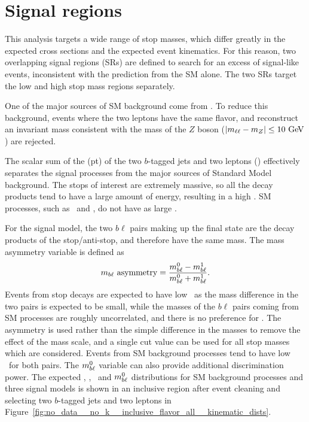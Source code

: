 \FloatBarrier
\section{Signal regions}
\label{sec:signal_regions}

This analysis targets a wide range of stop masses, which differ greatly in the
expected cross sections and the expected event kinematics.
For this reason, two overlapping signal regions (SRs) are defined to search for
an excess of signal-like events, inconsistent with the prediction from
the SM alone.
The two SRs target the low and high stop mass regions separately.

One of the major sources of SM background come from \ZGAMMAJETS.
To reduce this background, events where the two leptons have the same
flavor, and reconstruct an invariant mass consistent with the mass of the $Z$
boson ($|m_{\ell\ell} - m_{Z}| \leq 10 \GeV$) are rejected.

The scalar sum of the \et(pt) of the two $b$-tagged jets and two leptons (\HT) 
effectively separates the signal processes from the major sources of
Standard Model background.
The stops of interest are extremely massive, so all the decay products tend to
have a large amount of energy, resulting in a high \HT.
SM processes, such as \TTBAR\ and \ZGAMMAJETS, do not have as large \HT.

For the signal model, the two $b\ell$ pairs making up the final state are the
decay products of the stop/anti-stop, and therefore have the same mass.
The mass asymmetry variable is defined as
\begin{equation}
  m_{b\ell}~\mathrm{asymmetry} = 
  \frac{m_{b\ell}^0-m_{b\ell}^1}{m_{b\ell}^0+m_{b\ell}^1}.
\end{equation}
Events from stop decays are expected to have low \MBLASYM\ as the mass
difference in the two pairs is expected to be small, while the masses of the
$b\ell$ pairs coming from SM processes are roughly uncorrelated, and there is
no preference for \MBLASYM.
The asymmetry is used rather than the simple difference in the masses to remove
the effect of the mass scale, and a single cut value can be used for all stop
masses which are considered.
Events from SM background processes tend to have low \MBL\ for
both pairs.
The $m_{b\ell}^0$ variable can also provide additional discrimination power.
The expected \MLL, \HT, \MBLASYM\, and $m_{b\ell}^{0}$ distributions for SM
background processes and three signal models is shown in an inclusive region
after event cleaning and selecting two $b$-tagged jets and two leptons in
Figure~\ref{fig:no_data__no_k__inclusive_flavor_all__kinematic_dists}.

